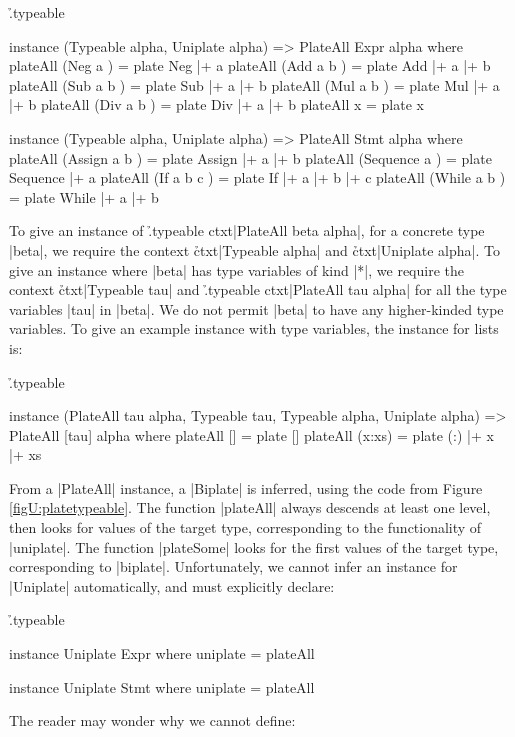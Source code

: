 \h{.typeable}\begin{code}
instance (Typeable alpha, Uniplate alpha) => PlateAll Expr alpha where
    plateAll (Neg a    )  = plate Neg  |+ a
    plateAll (Add a b  )  = plate Add  |+ a |+ b
    plateAll (Sub a b  )  = plate Sub  |+ a |+ b
    plateAll (Mul a b  )  = plate Mul  |+ a |+ b
    plateAll (Div a b  )  = plate Div  |+ a |+ b
    plateAll x            = plate x

instance (Typeable alpha, Uniplate alpha) => PlateAll Stmt alpha where
    plateAll (Assign    a b    ) = plate Assign    |+  a |+ b
    plateAll (Sequence  a      ) = plate Sequence  |+  a
    plateAll (If        a b c  ) = plate If        |+  a |+ b |+ c
    plateAll (While     a b    ) = plate While     |+  a |+ b
\end{code}

To give an instance of \h{.typeable ctxt}|PlateAll beta alpha|, for a concrete type |beta|, we require the context \h{ctxt}|Typeable alpha| and \h{ctxt}|Uniplate alpha|. To give an instance where |beta| has type variables of kind |*|, we require the context \h{ctxt}|Typeable tau| and \h{.typeable ctxt}|PlateAll tau alpha| for all the type variables |tau| in |beta|. We do not permit |beta| to have any higher-kinded type variables. To give an example instance with type variables, the instance for lists is:

\h{.typeable}\begin{code}
instance  (PlateAll tau alpha, Typeable tau, Typeable alpha, Uniplate alpha) =>
          PlateAll [tau] alpha where
    plateAll []     = plate []
    plateAll (x:xs) = plate (:) |+ x |+ xs
\end{code}

From a |PlateAll| instance, a |Biplate| is inferred, using the code from Figure \ref{figU:platetypeable}. The function |plateAll| always descends at least one level, then looks for values of the target type, corresponding to the functionality of |uniplate|. The function |plateSome| looks for the first values of the target type, corresponding to |biplate|. Unfortunately, we cannot infer an instance for |Uniplate| automatically, and must explicitly declare:

\h{.typeable}\begin{code}
instance Uniplate Expr where
    uniplate = plateAll

instance Uniplate Stmt where
    uniplate = plateAll
\end{code}

The reader may wonder why we cannot define:

